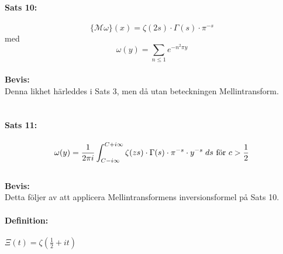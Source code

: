 \documentclass[a4paper,twoside]{article}%
\begin{document}
\paragraph{Sats 10:} 
\[
	\{\mathcal{M} \omega \} (x) = \zeta(2s) \cdot \Gamma(s) \cdot \pi^{-s}
\]
med 
\[
	\omega(y) = \sum\limits_{n \leq 1} e^{-n^2\pi y}
\]
\\
{\bf Bevis:} \\ 
Denna likhet härleddes i Sats 3, men då utan beteckningen Mellintransform.\\
\\
\paragraph{Sats 11:} 
\[
	\omega(y) = \frac {1} {2\pi i} \int_{C - i \infty}^{C + i \infty} \zeta(zs) \cdot \Gamma(s) \cdot \pi^{-s} \cdot
		y^{-s} \; ds \text{ för } c > \frac 1 2
\] 
\\
{\bf Bevis:}\\
Detta följer av att applicera Mellintransformens inversionsformel på Sats 10.\\

\paragraph{Definition:} $\Xi(t) = \zeta(\frac 1 2 + it)$ \\
\\
\newcommand{\helper}[1] {
	\int_#1^\infty (t^2 + \frac 1 4)^{-1}
}
\newcommand{\twelve}[1][0] {
	\helper{#1} \cdot \cos(xt) \; dt
}
\end{document}
